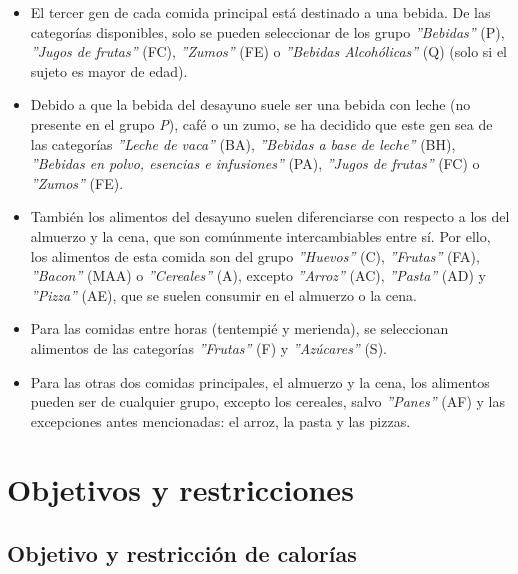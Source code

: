\begin{itemize}
    \item El tercer gen de cada comida principal está destinado a una bebida. De las categorías disponibles, solo se pueden seleccionar de los grupo \textit{''Bebidas''} (P), \textit{''Jugos de frutas''} (FC), \textit{''Zumos''} (FE) o \textit{''Bebidas Alcohólicas''} (Q) (solo si el sujeto es mayor de edad).
    \item Debido a que la bebida del desayuno suele ser una bebida con leche (no presente en el grupo \textit{P}), café o un zumo, se ha decidido que este gen sea de las categorías \textit{''Leche de vaca''} (BA), \textit{''Bebidas a base de leche''} (BH), \textit{''Bebidas en polvo, esencias e infusiones''} (PA), \textit{''Jugos de frutas''} (FC) o \textit{''Zumos''} (FE).
    \item También los alimentos del desayuno suelen diferenciarse con respecto a los del almuerzo y la cena, que son comúnmente intercambiables entre sí. Por ello, los alimentos de esta comida son del grupo \textit{''Huevos''} (C), \textit{''Frutas''} (FA), \textit{''Bacon''} (MAA) o \textit{''Cereales''} (A), excepto \textit{''Arroz''} (AC), \textit{''Pasta''} (AD) y \textit{''Pizza''} (AE), que se suelen consumir en el almuerzo o la cena.
    \item Para las comidas entre horas (tentempié y merienda), se seleccionan alimentos de las categorías \textit{''Frutas''} (F) y \textit{''Azúcares''} (S).
    \item Para las otras dos comidas principales, el almuerzo y la cena, los alimentos pueden ser de cualquier grupo, excepto los cereales, salvo \textit{''Panes''} (AF) y las excepciones antes mencionadas: el arroz, la pasta y las pizzas.
\end{itemize}


\section{Objetivos y restricciones}
\label{ch:objetivo-restricciones}

\subsection{Objetivo y restricción de calorías}
\label{ch:objetivo-restriccion-calorías}


